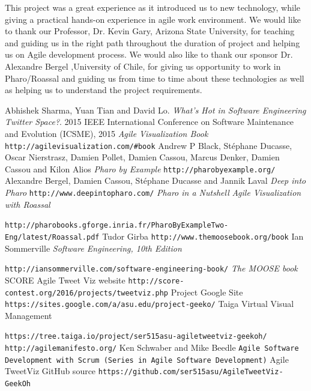 \documentclass[11pt]{article}
\begin{document}
This project was a great experience as it introduced us to new technology, while giving a practical hands-on experience in agile work environment. We would like to thank our Professor, Dr. Kevin Gary, Arizona State University, for teaching and guiding us in the right path throughout the duration of project and helping us on Agile development process. We would also like to thank our sponsor Dr. Alexandre Bergel ,University of Chile, for giving us opportunity to work in Pharo/Roassal and guiding us from time to time about these technologies as well as helping us to understand the project requirements.
\newpage
\begin{thebibliography}{7}
Abhishek Sharma, Yuan Tian and David Lo.
\textit{What's Hot in Software Engineering Twitter Space?}.
2015 IEEE International Conference on Software Maintenance and Evolution (ICSME), 2015
\textit{Agile Visualization Book}
\texttt{http://agilevisualization.com/\#book}
Andrew P Black, Stéphane Ducasse, Oscar Nierstrasz, Damien Pollet, Damien Cassou, Marcus Denker, Damien Cassou and Kilon Alios
\textit{Pharo by Example}
\texttt{http://pharobyexample.org/}
Alexandre Bergel, Damien Cassou, Stéphane Ducasse and Jannik Laval
\textit{Deep into Pharo}
\texttt{http://www.deepintopharo.com/}
\textit{Pharo in a Nutshell}
\textit{Agile Visualization with Roassal}


\texttt{http://pharobooks.gforge.inria.fr/PharoByExampleTwo-Eng/latest/Roassal.pdf}
Tudor Girba
\texttt{http://www.themoosebook.org/book}
Ian Sommerville
\textit{Software Engineering, 10th Edition}


\texttt{http://iansommerville.com/software-engineering-book/}
\textit{The MOOSE book}
SCORE Agile Tweet Viz website
\texttt{http://score-contest.org/2016/projects/tweetviz.php}
Project Google Site
\texttt{https://sites.google.com/a/asu.edu/project-geeko/}
Taiga Virtual Visual Management


\texttt{https://tree.taiga.io/project/ser515asu-agiletweetviz-geekoh/}
\texttt{http://agilemanifesto.org/}
Ken Schwaber and Mike Beedle
\texttt{Agile Software Development with Scrum (Series in Agile Software Development)}
Agile TweetViz GitHub source
\texttt{https://github.com/ser515asu/AgileTweetViz-GeekOh}
\end{thebibliography}
\end{document}
